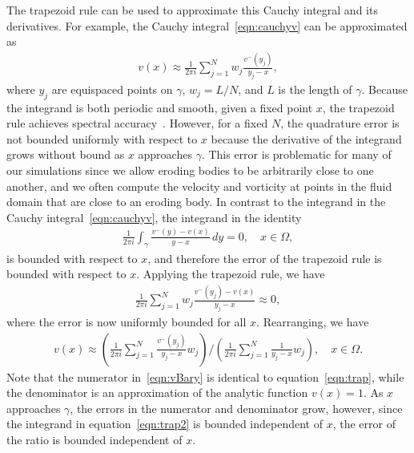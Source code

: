 \documentclass[3p]{elsarticle}
\begin{document}
The trapezoid rule can be used to approximate this Cauchy integral and
its derivatives. For example, the Cauchy integral~\eqref{eqn:cauchyv}
can be approximated as
\begin{align}
  v(x) \approx \frac{1}{2\pi i} \sum_{j=1}^{N} 
    w_j \frac{v^{-}(y_j)}{y_j - x},
  \label{eqn:trap}
\end{align}
where $y_j$ are equispaced points on $\gamma$, $w_j = L/N$, and $L$ is
the length of $\gamma$. Because the integrand is both periodic and
smooth, given a fixed point $x$, the trapezoid rule achieves spectral
accuracy~\cite{tre-wei2014}. However, for a fixed $N$, the quadrature
error is not bounded uniformly with respect to $x$ because the
derivative of the integrand grows without bound as $x$ approaches
$\gamma$. This error is problematic for many of our simulations since we
allow eroding bodies to be arbitrarily close to one another, and we
often compute the velocity and vorticity at points in the fluid domain
that are close to an eroding body. In contrast to the integrand in the
Cauchy integral~\eqref{eqn:cauchyv}, the integrand in the identity
\begin{align}
  \frac{1}{2\pi i}\int_{\gamma} 
    \frac{v^{-}(y) - v(x)}{y-x} \, dy = 0, \quad x \in \Omega,
  \label{eqn:trap2}
\end{align}
is bounded with respect to $x$, and therefore the error of the trapezoid
rule is bounded with respect to $x$. Applying the trapezoid rule, we
have
\begin{align}
  \frac{1}{2\pi i}\sum_{j=1}^{N} w_{j} 
    \frac{v^{-}(y_j) - v(x)}{y_j - x} \approx 0,
\end{align}
where the error is now uniformly bounded for all $x$. Rearranging, we
have
\begin{align}
  v(x) \approx \left(\frac{1}{2\pi i}\sum_{j=1}^N 
    \frac{v^{-}(y_j)}{y_j - x} w_j \right) \Bigg/
  \left(\frac{1}{2\pi i}\sum_{j=1}^N \frac{1}{y_j - x} w_j \right), 
  \quad x \in \Omega.
  \label{eqn:vBary}
\end{align}
Note that the numerator in~\eqref{eqn:vBary} is identical to
equation~\eqref{eqn:trap}, while the denominator is an approximation of
the analytic function $v(x) = 1$. As $x$ approaches $\gamma$, the errors
in the numerator and denominator grow, however, since the integrand in
equation~\eqref{eqn:trap2} is bounded independent of $x$, the error of
the ratio is bounded independent of $x$.
\end{document}
